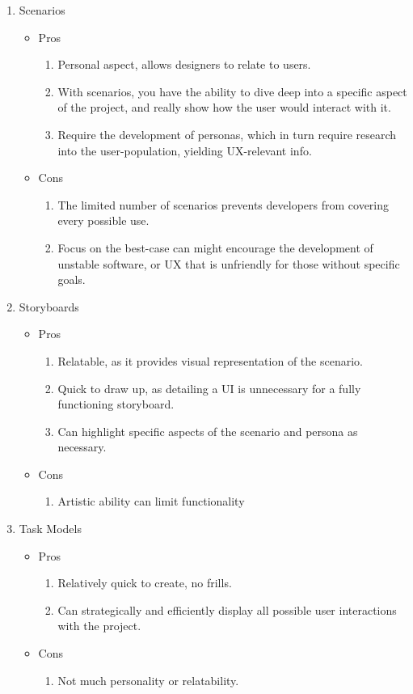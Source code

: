 \documentclass[5pt]{article} %
\begin{document}
\begin{enumerate}
\item Scenarios
\begin{itemize}
\item Pros
\begin{enumerate}
\item Personal aspect, allows designers to relate to users.  
\item With scenarios, you have the ability to dive deep into a specific aspect of the project, and really show how the user would interact with it.  
\item Require the development of personas, which in turn require research into the user-population, yielding UX-relevant info. 
\end{enumerate}
\item Cons
\begin{enumerate}
\item The limited number of scenarios prevents developers from covering every possible use.  
\item Focus on the best-case can might encourage the development of unstable software, or UX that is unfriendly for those without specific goals.
\end{enumerate}
\end{itemize}
\item Storyboards
\begin{itemize}
\item Pros
\begin{enumerate}
\item Relatable, as it provides visual representation of the scenario.  
\item Quick to draw up, as detailing a UI is unnecessary for a fully functioning storyboard.  
\item Can highlight specific aspects of the scenario and persona as necessary.  
\end{enumerate}
\item Cons
\begin{enumerate}
\item Artistic ability can limit functionality
\end{enumerate}
\end{itemize}
\item Task Models
\begin{itemize}
\item Pros
\begin{enumerate}
\item Relatively quick to create, no frills.  
\item Can strategically and efficiently display all possible user interactions with the project.
\end{enumerate}
\item Cons
\begin{enumerate}
\item Not much personality or relatability.  
\end{enumerate}
\end{itemize}
\end{enumerate}
\end{document}
